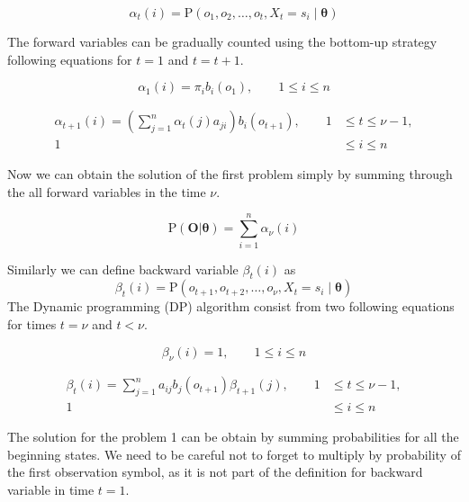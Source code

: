 \documentclass[thesis=M,english]{FITthesis}[2012/10/20]
\newcommand{\matr}[1]{\mathbf{#1}}
\begin{document}
\begin{equation}
\alpha_t(i) = \mathrm{P}(o_1,o_2,\dots,o_t,X_t = s_i \mid \matr{\theta} )
\end{equation}

The forward variables can be gradually counted using the bottom-up strategy following equations for $t=1$ and $t=t+1$.

\begin{equation}
\alpha_1(i) = \pi_i b_i(o_1), \qquad 1 \leq i \leq n
\end{equation}

\begin{equation}
\begin{aligned}
\alpha_{t+1}(i) = \left( \sum_{j=1}^n \alpha_t(j) a_{ji} \right) b_i(o_{t+1}), \qquad 1& \leq t \leq \nu - 1, \\ 
                                                                                 1& \leq i \leq n		\end{aligned}
\end{equation}

Now we can obtain the solution of the first problem simply by summing through the all forward variables in the time $\nu$.

\begin{equation}
\mathrm{P}(\matr{O}|\matr{\theta}) = \sum_{i=1}^n \alpha_{\nu}(i)
\end{equation} 

Similarly we can define backward variable $\beta_t(i)$ as
\begin{equation}
\beta_t(i) = \mathrm{P}(o_{t+1},o_{t+2},\dots,o_{\nu},X_t = s_i \mid \matr{\theta} ) 
\end{equation}
The Dynamic programming (DP) algorithm consist from two following equations for times $t = \nu$ and $t < \nu$. 

\begin{equation}
\beta_{\nu}(i) = 1, \qquad 1 \leq i \leq n
\end{equation}

\begin{equation}
\begin{aligned}
\beta_{t}(i) = \sum_{j=1}^n a_{ij} b_j(o_{t+1}) \beta_{t+1}(j), \qquad 1& \leq t \leq \nu - 1, \\ 
                                                                                 1& \leq i \leq n		\end{aligned}
\end{equation}

The solution for the problem 1 can be obtain by summing probabilities for all the beginning states. We need to be careful not to forget to multiply by probability of the first observation symbol, as it is not part of the definition for backward variable in time $t=1$.
\end{document}

